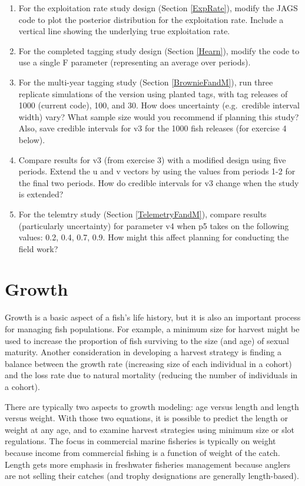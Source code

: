 \documentclass[
]{krantz}
\begin{document}
\begin{enumerate}
\def\labelenumi{\arabic{enumi}.}
\item
  For the exploitation rate study design (Section \ref{ExpRate}), modify the JAGS code to plot the posterior distribution for the exploitation rate. Include a vertical line showing the underlying true exploitation rate.
\item
  For the completed tagging study design (Section \ref{Hearn}), modify the code to use a single F parameter (representing an average over periods).
\item
  For the multi-year tagging study (Section \ref{BrownieFandM}), run three replicate simulations of the version using planted tags, with tag releases of 1000 (current code), 100, and 30. How does uncertainty (e.g.~credible interval width) vary? What sample size would you recommend if planning this study? Also, save credible intervals for v3 for the 1000 fish releases (for exercise 4 below).
\item
  Compare results for v3 (from exercise 3) with a modified design using five periods. Extend the u and v vectors by using the values from periods 1-2 for the final two periods. How do credible intervals for v3 change when the study is extended?
\item
  For the telemtry study (Section \ref{TelemetryFandM}), compare results (particularly uncertainty) for parameter v4 when p5 takes on the following values: 0.2, 0.4, 0.7, 0.9. How might this affect planning for conducting the field work?
\end{enumerate}

\hypertarget{Growth}{%
\chapter{Growth}\label{Growth}}

Growth is a basic aspect of a fish's life history, but it is also an important process for managing fish populations. For example, a minimum size for harvest might be used to increase the proportion of fish surviving to the size (and age) of sexual maturity. Another consideration in developing a harvest strategy is finding a balance between the growth rate (increasing size of each individual in a cohort) and the loss rate due to natural mortality (reducing the number of individuals in a cohort).

There are typically two aspects to growth modeling: age versus length and length versus weight. With those two equations, it is possible to predict the length or weight at any age, and to examine harvest strategies using minimum size or slot regulations. The focus in commercial marine fisheries is typically on weight because income from commercial fishing is a function of weight of the catch. Length gets more emphasis in freshwater fisheries management because anglers are not selling their catches (and trophy designations are generally length-based).
\end{document}
